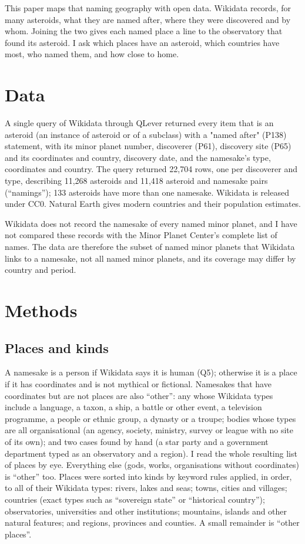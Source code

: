 \documentclass[11pt,a4paper]{article}
\begin{document}
This paper maps that naming geography with open data. Wikidata \citep{wikidata} records, for many asteroids, what they are named after, where they were discovered and by whom. Joining the two gives each named place a line to the observatory that found its asteroid. I ask which places have an asteroid, which countries have most, who named them, and how close to home.

\section{Data}
A single query of Wikidata through QLever \citep{qlever} returned every item that is an asteroid (an instance of asteroid or of a subclass) with a "named after" (P138) statement, with its minor planet number, discoverer (P61), discovery site (P65) and its coordinates and country, discovery date, and the namesake's type, coordinates and country. The query returned 22,704 rows, one per discoverer and type, describing 11,268 asteroids and 11,418 asteroid and namesake pairs (``namings''); 133 asteroids have more than one namesake. Wikidata is released under CC0. Natural Earth \citep{naturalearth} gives modern countries and their population estimates.

Wikidata does not record the namesake of every named minor planet, and I have not compared these records with the Minor Planet Center's complete list of names. The data are therefore the subset of named minor planets that Wikidata links to a namesake, not all named minor planets, and its coverage may differ by country and period.

\section{Methods}
\subsection{Places and kinds}
A namesake is a person if Wikidata says it is human (Q5); otherwise it is a place if it has coordinates and is not mythical or fictional. Namesakes that have coordinates but are not places are also ``other'': any whose Wikidata types include a language, a taxon, a ship, a battle or other event, a television programme, a people or ethnic group, a dynasty or a troupe; bodies whose types are all organisational (an agency, society, ministry, survey or league with no site of its own); and two cases found by hand (a star party and a government department typed as an observatory and a region). I read the whole resulting list of places by eye. Everything else (gods, works, organisations without coordinates) is ``other'' too. Places were sorted into kinds by keyword rules applied, in order, to all of their Wikidata types: rivers, lakes and seas; towns, cities and villages; countries (exact types such as ``sovereign state'' or ``historical country''); observatories, universities and other institutions; mountains, islands and other natural features; and regions, provinces and counties. A small remainder is ``other places''.
\end{document}
